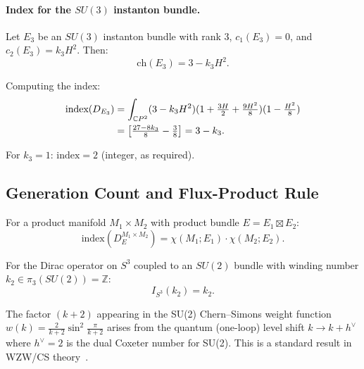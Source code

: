 \paragraph{Index for the $SU(3)$ instanton bundle.}
Let $E_3$ be an $SU(3)$ instanton bundle with rank 3, $c_1(E_3) = 0$, and $c_2(E_3) = k_3 H^2$. Then:
\begin{equation}
\text{ch}(E_3) = 3 - k_3 H^2.
\end{equation}

Computing the index:
\begin{align}
\text{index}(D_{E_3}) &= \int_{\mathbb{C}P^2} (3 - k_3 H^2)(1 + \tfrac{3H}{2} + \tfrac{9H^2}{8})(1 - \tfrac{H^2}{8}) \notag \\
&= \left[\tfrac{27-8k_3}{8} - \tfrac{3}{8}\right] = 3 - k_3.
\end{align}

For $k_3 = 1$: $\text{index} = 2$ (integer, as required).

\subsection{Generation Count and Flux-Product Rule}\label{app:generations}

\begin{theorem}
For a product manifold $M_1 \times M_2$ with product bundle $E = E_1 \boxtimes E_2$:
\begin{equation}
\text{index}(D_E^{M_1 \times M_2}) = \chi(M_1; E_1) \cdot \chi(M_2; E_2).
\end{equation}
\end{theorem}

\begin{theorem}
For the Dirac operator on $S^3$ coupled to an $SU(2)$ bundle with winding number $k_2 \in \pi_3(SU(2)) = \mathbb{Z}$:
\begin{equation}
I_{S^3}(k_2) = k_2.
\end{equation}
\end{theorem}

\begin{remark}
The factor $(k+2)$ appearing in the SU(2) Chern--Simons weight function $w(k) = \frac{2}{k+2}\sin^2\frac{\pi}{k+2}$ arises from the quantum (one-loop) level shift $k \to k + h^\vee$ where $h^\vee = 2$ is the dual Coxeter number for SU(2). This is a standard result in WZW/CS theory~\cite{Witten1989}.
\end{remark}

